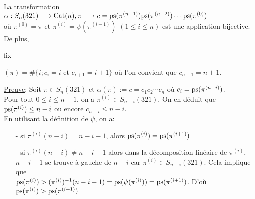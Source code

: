 \begin{proposition} \label{bijCatN} \text{ }\\
	La transformation $\alpha: S_{n}(321)\longrightarrow \begin{rm}Cat\end{rm}(n), \pi \longrightarrow c=\begin{rm}ps\end{rm}(\pi^{(n-1)})\begin{rm}ps\end{rm}(\pi^{(n-2)})\cdots \begin{rm}ps\end{rm}(\pi^{(0)}) $\\ où $\pi^{(0)}=\pi \text{ et } \pi^{(i)}=\psi(\pi^{(i-1)})$ $(1\leq i \leq n)$ est une application bijective.\\
	De plus, \begin{rm}fix\end{rm}$(\pi)=\# \{i; c_{i}=i \text{ et }c_{i+1}=i+1\}$ où l'on convient que $c_{n+1}=n+1$.
\end{proposition}
\underline{Preuve}:
Soit $\pi\in S_{n}(321)$ et $\alpha(\pi):=c=c_{1}c_{2}\cdots c_{n}$ où $c_{i}=\begin{rm}ps\end{rm}(\pi^{(n-i)})$.
\\Pour tout $0\leq i \leq n-1$, on a $\pi^{(i)}\in S_{n-i}(321)$.
On en déduit que $\begin{rm}ps\end{rm}(\pi^{(i)})\leq n-i$ ou encore $c_{n-i}\leq n-i$.\\
En utilisant la définition de $\psi$, on a:
\begin{itemize}
	\item [-] si $\pi^{(i)}(n-i)=n-i-1$, alors $\begin{rm}ps\end{rm}(\pi^{(i)})=\begin{rm}ps\end{rm}(\pi^{(i+1)})$
	\item [-] si $\pi^{(i)}(n-i)\neq n-i-1$ alors dans la décomposition linéaire de $\pi^{(i)}$, $n-i-1$ se trouve à gauche de $n-i$ car $\pi^{(i)}\in S_{n-i}(321)$. Cela implique que \\ $\begin{rm}ps\end{rm}(\pi^{(i)})>(\pi^{(i)})^{-1}(n-i-1) = \begin{rm}ps\end{rm}(\psi(\pi^{(i)})) = \begin{rm}ps\end{rm}(\pi^{(i+1)})$. D'où $\begin{rm}ps\end{rm}(\pi^{(i)}) > \begin{rm}ps\end{rm}(\pi^{(i+1)})$
\end{itemize}
